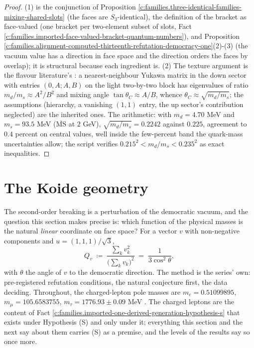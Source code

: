 \documentclass[11pt]{article}
\theoremstyle{definition}
\theoremstyle{plain}
\begin{document}
\begin{proof}
(1) is the conjunction of Proposition \ref{c:families.three-identical-families-mixing-shared-slots} (the faces are $S_{3}$-identical), the definition of the bracket as face-valued (one bracket per two-element subset of slots, Fact \ref{c:families.imported-face-valued-bracket-quantum-numbers}), and Proposition \ref{c:families.alignment-computed-thirteenth-refutation-democracy-one}(2)-(3) (the vacuum value has a direction in face space and the direction orders the faces by overlap); it is structural because each ingredient is. (2) The texture argument is the flavour literature's \cite{GST1968, Fritzsch1978}: a nearest-neighbour Yukawa matrix in the down sector with entries $(0, A; A, B)$ on the light two-by-two block has eigenvalues of ratio $m_{d}/m_{s} \approx A^{2}/B^{2}$ and mixing angle $\tan\theta_{C} \approx A/B$, whence $\theta_{C} \approx \sqrt{m_{d}/m_{s}}$; the assumptions (hierarchy, a vanishing $(1,1)$ entry, the up sector's contribution neglected) are the inherited ones. The arithmetic: with $m_{d} = 4.70$ MeV and $m_{s} = 93.5$ MeV \cite{PDG2024} ($\overline{\mathrm{MS}}$ at $2$ GeV), $\sqrt{m_{d}/m_{s}} = 0.2242$ against $0.225$, agreement to $0.4$ percent on central values, well inside the few-percent band the quark-mass uncertainties allow; the script verifies $0.215^{2} < m_{d}/m_{s} < 0.235^{2}$ as exact inequalities.

\end{proof}

\section{The Koide geometry}

\label{c:note.families.setting-koide-geometry}
The second-order breaking is a perturbation of the democratic vacuum, and the question this section makes precise is: which function of the physical masses is the natural \emph{linear} coordinate on face space? For a vector $v$ with non-negative components and $u = (1,1,1)/\sqrt{3}$,
\[
Q_{v} \;\coloneqq\; \frac{\sum_{k} v_{k}^{2}}{\bigl(\sum_{k} v_{k}\bigr)^{2}} \;=\; \frac{1}{3\cos^{2}\theta},
\]
with $\theta$ the angle of $v$ to the democratic direction. The method is the series' own: pre-registered refutation conditions, the natural conjecture first, the data deciding. Throughout, the charged-lepton pole masses are $m_{e} = 0.51099895$, $m_{\mu} = 105.6583755$, $m_{\tau} = 1776.93 \pm 0.09$ MeV \cite{PDG2024}. The charged leptons are the content of Fact \ref{c:families.imported-one-derived-generation-hypothesis-s} that exists under Hypothesis (S) and only under it; everything this section and the next say about them carries (S) as a premise, and the levels of the results say so once more.
\end{document}
